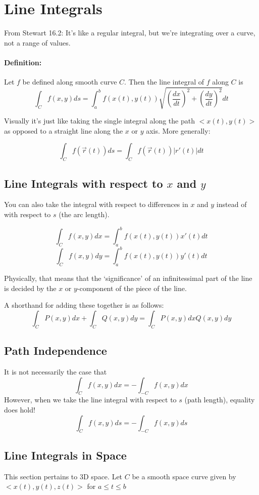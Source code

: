 \documentclass[a4paper,12pt]{report}
\begin{document}
\section{Line Integrals}
From Stewart 16.2: It's like a regular integral, but we're integrating over a curve, not a 
range of values.
\paragraph{Definition: } Let $f$ be defined along smooth curve $C$. Then the line integral of $f$ 
along $C$ is $$\int_C f(x, y) ds = \int_a^b f(x(t), y(t)) \sqrt{(\frac{dx}{dt})^2 + (\frac{dy}{dt})^2} dt$$

Visually it's just like taking the single integral along the path $<x(t), y(t)>$ as opposed to a straight line 
along the $x$ or $y$ axis. More generally: 

$$\int_C f(\vec{r}(t)) ds = \int_C f(\vec{r}(t))|r'(t)|dt$$

\subsection{Line Integrals with respect to $x$ and $y$}
You can also take the integral with respect to differences in $x$ and $y$ instead of with respect to 
$s$ (the arc length).

$$\int_C f(x, y) dx = \int_a^b f(x(t), y(t)) x'(t) dt$$
$$\int_C f(x, y) dy = \int_a^b f(x(t), y(t)) y'(t) dt$$

Physically, that means that the `significance' of an infinitessimal part of the line is decided by the $x$ or $y$-component 
of the piece of the line. 

A shorthand for adding these together is as follows: 
$$\int_C P(x, y) dx + \int_C Q(x, y) dy = \int_C P(x, y) dx Q(x, y) dy$$

\subsection{Path Independence}
It is not necessarily the case that $$\int_C f(x, y) dx = -\int_{-C}f(x, y) dx$$
However, when we take the line integral with respect to $s$ (path length), equality does hold! 
$$\int_C f(x, y) ds = -\int_{-C}f(x, y)ds$$

\subsection{Line Integrals in Space}
This section pertains to 3D space. Let $C$ be a smooth space curve given by $<x(t), y(t), z(t)>$ for $a \leq t \leq b$
\end{document}
